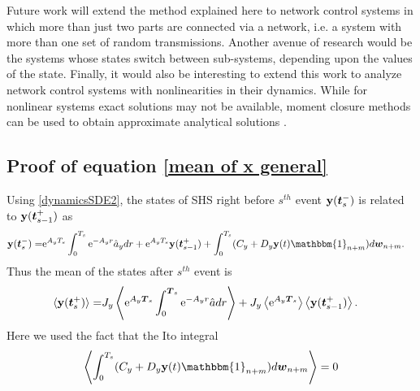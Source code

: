 \documentclass[letterpaper, 10 pt,one column, conference]{ieeeconf}  %
\begin{document}
Future work will extend the method explained here to network control systems in which more than just two parts are connected via a network, i.e. a system with more than one set of random transmissions. Another avenue of research would be the systems whose states switch between sub-systems, depending upon the values of the state. Finally, it would also be interesting to extend this work to analyze network control systems with nonlinearities in their dynamics. While for nonlinear systems exact solutions may not be available, moment closure methods can be used to obtain approximate analytical solutions \cite{sih10,sih10a, svs15,sih05}. 



\appendix

\subsection{Proof of equation \eqref{mean of x general} }
Using \eqref{dynamicsSDE2}, the states of SHS right before $s^{th}$ event ${\bold{y}}(\boldsymbol t_{s}^-)$ is related to ${\bold{y}}(\boldsymbol t_{s-1}^+) $ as  
\begin{equation}\begin{aligned}
{\bold{y}}(\boldsymbol t_{s}^-)  = &{\rm e}^{ A_y T_s} \int_0^{T_s}  {\rm e}^{ -A_yr} \hat{a}_y dr
+  {\rm e}^{ A_y T_s } {\bold{y}}(\boldsymbol t_{s-1}^+)   
+ \int_0^{T_s}  (C_y+D_y\bold{y}(t)\mathbbm{1}_{n+m})d \boldsymbol w_{n+m} .  \label{right before}
\end{aligned}
\end{equation}
Thus the mean of the states after $s^{th}$ event is  
\begin{equation}\begin{aligned}
\langle {\bold{y}}(\boldsymbol t_{s}^+)   \rangle = &J_y \left \langle {\rm e}^{ A_y \boldsymbol T_s} \int_0^{\boldsymbol T_s}  {\rm e}^{ -A_y r} \hat{a} dr \right \rangle  + J_y \left \langle {\rm e}^{ A _y\boldsymbol T_s } \right \rangle  \left \langle  {\bold{y}}(\boldsymbol t_{s-1}^+)   \right \rangle   . 
\end{aligned}\label{xi0}
\end{equation} 
Here we used the fact that the Ito integral 
\begin{equation}\begin{aligned} \left\langle 
 \int_0^{T_s}  (C_y+D_y\bold{y}(t)\mathbbm{1}_{n+m})d \boldsymbol w_{n+m} \right \rangle  =0
\end{aligned}
\end{equation}
\end{document}
